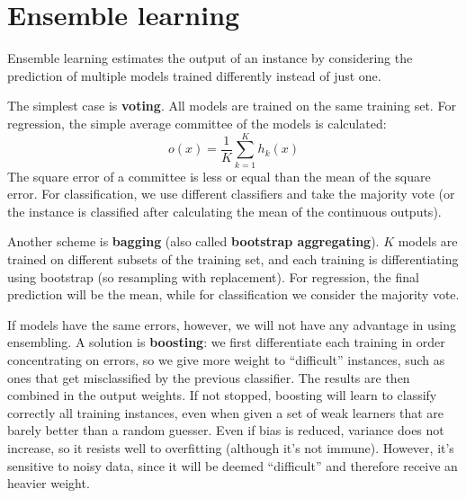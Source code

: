 \section{Ensemble learning}

Ensemble learning estimates the output of an instance by considering the prediction of multiple models trained differently instead of just one.

The simplest case is \textbf{voting}. All models are trained on the same training set. For regression, the simple average committee of the models is calculated:
\begin{equation*}
    o(x) = \dfrac{1}{K} \sum_{k=1}^K h_k(x)
\end{equation*}
The square error of a committee is less or equal than the mean of the square error. For classification, we use different classifiers and take the majority vote (or the instance is classified after calculating the mean of the continuous outputs).

Another scheme is \textbf{bagging} (also called \textbf{bootstrap aggregating}). $K$ models are trained on different subsets of the training set, and each training is differentiating using bootstrap (so resampling with replacement). For regression, the final prediction will be the mean, while for classification we consider the majority vote.

If models have the same errors, however, we will not have any advantage in using ensembling. A solution is \textbf{boosting}: we first differentiate each training in order concentrating on errors, so we give more weight to ``difficult'' instances, such as ones that get misclassified by the previous classifier. The results are then combined in the output weights. If not stopped, boosting will learn to classify correctly all training instances, even when given a set of weak learners that are barely better than a random guesser. Even if bias is reduced, variance does not increase, so it resists well to overfitting (although it's not immune). However, it's sensitive to noisy data, since it will be deemed ``difficult'' and therefore receive an heavier weight.

